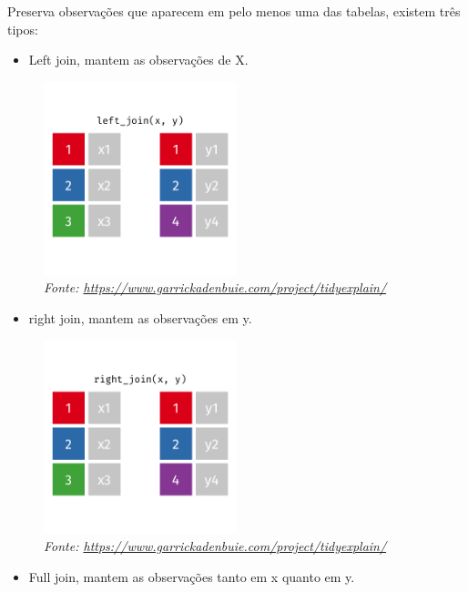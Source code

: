 \documentclass[
]{article}
\providecommand{\tightlist}{%
  \setlength{\itemsep}{0pt}\setlength{\parskip}{0pt}}
\begin{document}
Preserva observações que aparecem em pelo menos uma das tabelas, existem
três tipos:

\begin{itemize}
\tightlist
\item
  Left join, mantem as observações de X.
\end{itemize}

\begin{figure}
\centering
\includegraphics[width=0.5\textwidth,height=\textheight]{left-join.gif}
\caption{\emph{Fonte:
\url{https://www.garrickadenbuie.com/project/tidyexplain/}}}
\end{figure}

\begin{itemize}
\tightlist
\item
  right join, mantem as observações em y.
\end{itemize}

\begin{figure}
\centering
\includegraphics[width=0.5\textwidth,height=\textheight]{right-join.gif}
\caption{\emph{Fonte:
\url{https://www.garrickadenbuie.com/project/tidyexplain/}}}
\end{figure}

\begin{itemize}
\tightlist
\item
  Full join, mantem as observações tanto em x quanto em y.
\end{itemize}
\end{document}
